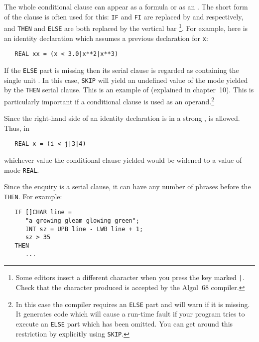 The whole conditional clause can appear as a formula or as an
.  The short form of the clause is often used for this:
\verb|IF| and \verb|FI| are replaced by \ixtt{(} and \ixtt{)}
respectively, and \verb|THEN| and \verb|ELSE| are both replaced by
the vertical bar %
\footnote{Some editors insert a different character when you press
the key marked \texttt{|}. Check that the character produced is
accepted by the Algol~68 compiler.}. For example, here is an identity
declaration which assumes a previous declaration for \verb|x|:
\begin{verbatim}
   REAL xx = (x < 3.0|x**2|x**3)
\end{verbatim}
\noindent
If the \verb|ELSE| part is missing then its serial clause is regarded
as containing the single unit .  In this case, \verb|SKIP|
will yield an undefined value of the mode yielded by the \verb|THEN|
serial clause.  This is an example of  (explained in
chapter~10).  This is particularly important if a conditional clause
is used as an operand.\footnote{In this case the
\protect{} compiler
requires an \texttt{ELSE} part and will warn if it is missing.
It generates code which will cause a run-time fault if your program
tries to execute an \texttt{ELSE} part which has been omitted. You can
get around this restriction by explicitly using \texttt{SKIP}.}

Since the right-hand side of an identity declaration is in a strong
,
 is allowed. Thus, in
\begin{verbatim}
   REAL x = (i < j|3|4)
\end{verbatim}
\noindent
whichever value the conditional clause yielded would be widened to a
value of mode \verb|REAL|.

Since the enquiry  is a serial clause,
it can have any number of phrases before the \verb|THEN|. For example:
\begin{verbatim}
   IF []CHAR line =
      "a growing gleam glowing green";
      INT sz = UPB line - LWB line + 1;
      sz > 35
   THEN
      ...
\end{verbatim}

